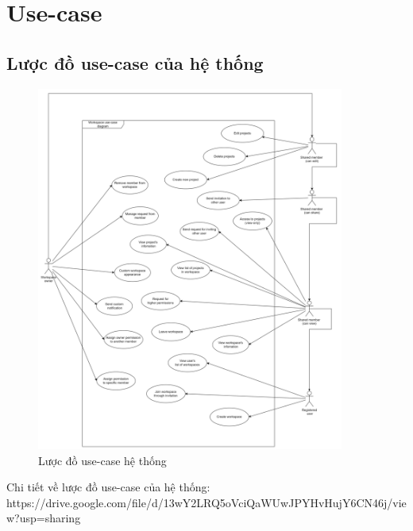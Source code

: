 \section{Use-case}
\subsection{Lược đồ use-case của hệ thống}

\begin{figure}[H]
    \begin{center}
        \includegraphics[width=0.9\textwidth]{Content/Phân tích và thiết kế hệ thống/documents/Use case/images/System usecase.png}
        \vspace{0.5cm}
        \caption{Lược đồ use-case hệ thống}
        \label{fig: Lược đồ use-case hệ thống}
    \end{center}
\end{figure}

Chi tiết về lược đồ use-case của hệ thống: 
\newline
https://drive.google.com/file/d/13wY2LRQ5oVciQaWUwJPYHvHujY6CN46j/view?usp=sharing  




